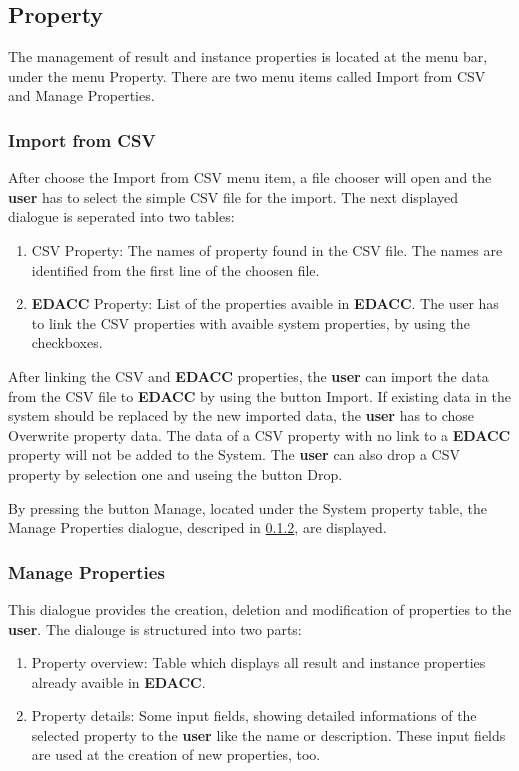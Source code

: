 \subsection{Property}
The management of result and instance properties is located at the menu bar, under the menu Property. There are two menu items called Import from CSV and Manage Properties.

\subsubsection{Import from CSV}
After choose the Import from CSV menu item, a file chooser will open and the \textbf{user} has to select the simple CSV file for the import. The next displayed dialogue is seperated into two tables:
\begin{enumerate}
	\item CSV Property: The names of property found in the CSV file. The names are identified from the first line of the choosen file.
	\item \textbf{EDACC} Property: List of the properties avaible in \textbf{EDACC}. The user has to link the CSV properties with avaible system properties, by using the checkboxes. 
\end{enumerate}

After linking the CSV and \textbf{EDACC} properties, the \textbf{user} can import the data from the CSV file to \textbf{EDACC} by using the button Import. If existing data in the system should be replaced by the new imported data, the \textbf{user} has to chose Overwrite property data.
\attention The data of a CSV property with no link to a \textbf{EDACC} property will not be added to the System. The \textbf{user} can also drop a CSV property by selection one and useing the button Drop.

By pressing the button Manage, located under the System property table, the Manage Properties dialogue, descriped in \ref{}, are displayed.

\subsubsection{Manage Properties} 
This dialogue provides  the creation, deletion and modification of properties to the \textbf{user}. The dialouge is structured into two parts:
\begin{enumerate}
	\item Property overview: Table which displays all result and instance properties already avaible in \textbf{EDACC}.
	\item Property details: Some input fields, showing detailed informations of the selected property to the \textbf{user} like the name or description. These input fields are used at the creation of new properties, too. 
\end{enumerate}

